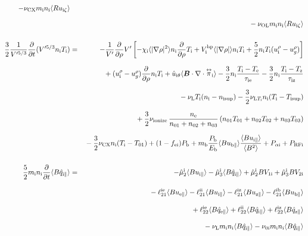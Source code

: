 \documentclass[11pt]{article}
\def\bvec#1{\leavevmode\hbox{\boldmath$#1$}}
\let\vec=\bvec
\def\r#1{{\rm#1}}
\def\aves#1{\langle#1\rangle}
\def\tensor#1{\mathord{\displaystyle\mathop{#1}^\leftrightarrow}}
\def\para{\parallel}
\def\ddrho{\frac{\partial}{\partial\rho}}
\def\ddt{\frac{\partial}{\partial t}}
\def\mi{m_\r{i}}
\def\mb{m_\r{b}}
\def\nee{n_\r{e}}
\def\ni{n_\r{i}}
\def\Te{T_\r{e}}
\def\Ti{T_\r{i}}
\def\Tz{T_\r{z}}
\def\uzt#1{u_{\r{#1}\zeta}}
\def\upara#1{u_{\r{#1}\para}}
\def\uhatth#1{\hat{u}_{\r{#1}\theta}}
\def\qhatpara#1{\hat{q}_{\r{#1}\para}}
\def\urho#1{u_\r{#1}^\rho}
\def\ugrho{u_{g}^\rho}
\def\chis#1{\chi_\r{#1}}
\def\nun#1{\nu_\r{0#1}}
\def\nsup#1{n_\r{#1sup}}
\def\Tsup#1{T_\r{#1sup}}
\def\nuLT#1{\nu_{\r{L}T_\r{#1}}}
\def\PRF#1{P_\r{RF#1}}
\def\Palp#1{P_{\alpha\r{#1}}}
\def\fei{f_\r{ei}}
\def\Pb{P_\r{b}}
\def\Eb{E_\r{b}}
\def\nna{n_{01}}
\def\nnb{n_{02}}
\def\nnc{n_{03}}
\def\Tna{T_{01}}
\def\Tnb{T_{02}}
\def\Tnc{T_{03}}
\def\nuL{\nu_\r{L}}
\def\nuCX{\nu_\r{CX}}
\def\nuion{\nu_\r{ionize}}
\def\nuOL{\nu_\r{OL}}
\begin{document}
\begin{eqnarray}
%
  - \nuCX \mi \ni \aves{R \uzt{i}}
\nonumber\\[2.5mm]&&{}
%
  - \nuOL \mi \ni \aves{R \uzt{i}}
\\[5mm]
 \frac{3}{2}\frac{1}{V'^{5/3}} \ddt (V'^{5/3} \ni \Ti ) &=& 
%
  - \frac{1}{V'} \ddrho V'
    \left[ - \chis{i}          \aves{|\nabla\rho|^2} \ni \ddrho \Ti
           + V_\r{i}^\r{hp} \aves{|\nabla\rho|}   \ni \Ti
           + \frac{5}{2} \ni \Ti ( \urho{i} - \ugrho ) \right]
\nonumber\\[2.5mm]&&{}
%
  + ( \urho{i} - \ugrho ) \ddrho \ni \Ti
%
  + \uhatth{i} \aves{\vec{B}\cdot\nabla\cdot\tensor{\pi}_\r{i}}
%
  - \frac{3}{2} \ni \frac{ \Ti - \Te }{\tau_\r{ie}}
  - \frac{3}{2} \ni \frac{ \Ti - \Tz }{\tau_\r{iz}}
\nonumber\\[2.5mm]&&{}
%
  - \nuL \Ti (\ni - \nsup{i})
%
  - \frac{3}{2} \nuLT{i} \ni (\Ti - \Tsup{i})
%
\nonumber\\[2.5mm]&&{}
  + \frac{3}{2} \nuion\, \frac{\nee}{\nna + \nnb + \nnc}\, (\nna \Tna +
  \nnb \Tnb + \nnc \Tnc)
\nonumber\\[2.5mm]&&{}
%
  - \frac{3}{2} \nuCX \ni (\Ti - \Tna)
%
  + (1 - \fei) \Pb
%
  + \mb \frac{\Pb}{\Eb} \aves{B \upara{b}} \frac{\aves{B \upara{i}}}{\aves{B^2}}
%
  + \Palp{i}
%
  + \PRF{i}
\\[5mm]
 \frac{5}{2} \mi \ni \ddt \aves{B \qhatpara{i}} &=&
%
  - \hat{\mu}_2^\r{i} \aves{B \upara{i}} 
  - \hat{\mu}_3^\r{i} \aves{B \qhatpara{i}}
%
  + \hat{\mu}_2^\r{i} {B V_{1\r{i}}} 
  + \hat{\mu}_3^\r{i} {B V_{2\r{i}}}
\nonumber\\[3mm]&&{}
%
  - \ell_{21}^{\r{ie}} \aves{B \upara{e}}
  - \ell_{21}^{\r{ii}} \aves{B \upara{i}}
  - \ell_{21}^{\r{iz}} \aves{B \upara{z}}
  - \ell_{21}^{\r{ib}} \aves{B \upara{b}}
\nonumber\\[3mm]&&{}
%
  + \ell_{22}^{\r{ie}} \aves{B \qhatpara{e}}
  + \ell_{22}^{\r{ii}} \aves{B \qhatpara{i}}
  + \ell_{22}^{\r{iz}} \aves{B \qhatpara{z}}
\nonumber\\[3mm]&&{}
%
  - \nuL \mi \ni \aves{B \qhatpara{i}}
%
  - \nun{i} \mi \ni \aves{B \qhatpara{i}}
\end{eqnarray}
%
\end{document}
